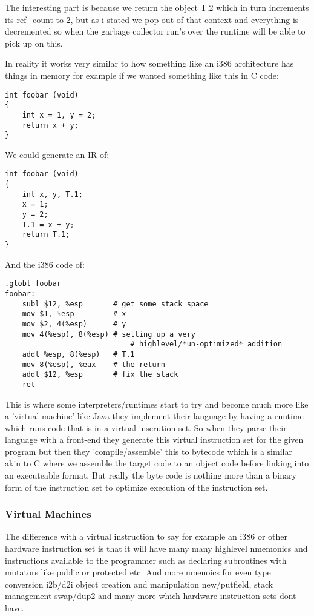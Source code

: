 \documentclass[defaultstyle,11pt]{article}
\begin{document}
The interesting part is because we return the object T.2 which in turn increments its ref\_count to 2,
but as i stated we pop out of that context and everything is decremented so when the garbage collector
run's over the runtime will be able to pick up on this.

In reality it works very similar to how something like an i386 architecture has things in memory for example
if we wanted something like this in C code:

\begin{lstlisting}
int foobar (void)
{
	int x = 1, y = 2;
	return x + y;
}
\end{lstlisting}

We could generate an IR of:

\begin{lstlisting}
int foobar (void)
{
	int x, y, T.1;
	x = 1;
	y = 2;
	T.1 = x + y;
	return T.1;
}
\end{lstlisting}

And the i386 code of:

\begin{lstlisting}
.globl foobar
foobar:
	subl $12, %esp       # get some stack space
	mov $1, %esp         # x
	mov $2, 4(%esp)      # y
	mov 4(%esp), 8(%esp) # setting up a very
                             # highlevel/*un-optimized* addition
	addl %esp, 8(%esp)   # T.1
	mov 8(%esp), %eax    # the return
	addl $12, %esp       # fix the stack
	ret
\end{lstlisting}

This is where some interpreters/runtimes start to try and become much more like a 'virtual machine' like Java
they implement their language by having a runtime which runs code that is in a virtual inscrution set. So when
they parse their language with a front-end they generate this virtual instruction set for the given program
but then they 'compile/assemble' this to bytecode which is a similar akin to C where we assemble the target
code to an object code before linking into an executeable format. But really the byte code is nothing more than
a binary form of the instruction set to optimize execution of the instruction set.

\subsubsection{Virtual Machines}
The difference with a virtual instruction to say for example an i386 or other hardware instruction set is
that it will have many many highlevel nmemonics and instructions available to the programmer such as declaring
subroutines with mutators like public or protected etc. And more nmenoics for even type conversion i2b/d2i
object creation and manipulation new/putfield, stack management swap/dup2 and many more which hardware
instruction sets dont have.
\end{document}
